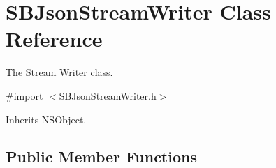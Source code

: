 \hypertarget{interface_s_b_json_stream_writer}{
\section{SBJsonStreamWriter Class Reference}
\label{interface_s_b_json_stream_writer}
}


The Stream Writer class.  




{\ttfamily \#import $<$SBJsonStreamWriter.h$>$}



Inherits NSObject.

\subsection*{Public Member Functions}
